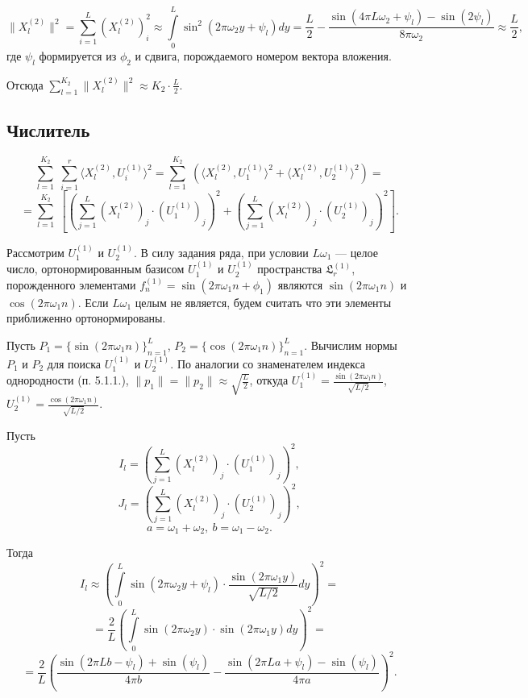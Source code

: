 \documentclass[specialist, substylefile = spbu.rtx,
			   subf, href, 12pt]{disser}
\begin{document}
$$ \|X_l^{(2)}\|^2 = \sum\limits_{i=1}^{L}(X_{l}^{(2)})_i^2 \approx \int\limits_{0}^{L}\sin^2{(2\pi\omega_2 y + \psi_l)}dy = \frac{L}{2} - \frac{\sin(4\pi L\omega_2 + \psi_l) - \sin(2\psi_l)}{8\pi\omega_2} \approx \frac{L}{2}, $$
где $ \psi_l $ формируется из $ \phi_2 $ и сдвига, порождаемого номером вектора вложения.

Отсюда $\sum\limits_{l=1}^{K_2}\|X_l^{(2)}\|^2 \approx K_2\cdot\frac{L}{2}$.


\subsection{Числитель}
$$ \sum\limits_{l=1}^{K_2}\;\sum\limits_{i=1}^{r}\langle X_l^{(2)}, U_i^{(1)}\rangle^2 = 
\sum\limits_{l=1}^{K_2}\;\left ( \langle X_l^{(2)}, U_1^{(1)}\rangle^2 + \langle X_l^{(2)}, U_2^{(1)}\rangle^2 \right ) = $$
$$ =  \sum\limits_{l=1}^{K_2}\; \left [ \left (\sum\limits_{j=1}^{L}(X_{l}^{(2)})_j\cdot (U_{1}^{(1)})_j\right )^2 + \left ( \sum\limits_{j=1}^{L}(X_{l}^{(2)})_j\cdot (U_{2}^{(1)})_j\right )^2 \right ].$$

Рассмотрим $ U_{1}^{(1)} $ и $U_{2}^{(1)} $. В силу задания ряда, при условии $ L\omega_1 $ --- целое число, ортонормированным базисом $ U_{1}^{(1)} $ и $U_{2}^{(1)} $ пространства $ \mathfrak{L}_r^{(1)} $, порожденного элементами $ f_n^{(1)} = \sin(2\pi\omega_1 n + \phi_1) $ являются $ \sin(2\pi\omega_1 n) $ и $ \cos(2\pi\omega_1 n) $. Если $ L\omega_1 $ целым не является, будем считать что эти элементы приближенно ортонормированы.

Пусть $ P_1 = \{\sin(2\pi\omega_1 n)\}_{n=1}^L $, $ P_2 = \{\cos(2\pi\omega_1 n)\}_{n=1}^L $. Вычислим нормы $ P_1 $ и $ P_2 $ для поиска $ U_{1}^{(1)} $ и $U_{2}^{(1)} $. 
По аналогии со знаменателем индекса однородности (п. 5.1.1.), $ \|p_1\| = \|p_2\| \approx \sqrt{\frac{L}{2}} $, откуда $ U_{1}^{(1)} = \frac{\sin(2\pi\omega_1 n)}{\sqrt{L/2}} $, $ U_{2}^{(1)} = \frac{\cos(2\pi\omega_1 n)}{\sqrt{L/2}} $.

Пусть  
$$ I_l =  \left (\sum\limits_{j=1}^{L}(X_{l}^{(2)})_j\cdot (U_{1}^{(1)})_j\right )^2, $$
$$ J_l =  \left (\sum\limits_{j=1}^{L}(X_{l}^{(2)})_j\cdot (U_{2}^{(1)})_j\right )^2, $$
$$ a = \omega_1 + \omega_2,\ b = \omega_1 - \omega_2. $$

Тогда
$$ I_l \approx \left( \int\limits_{0}^{L}\sin(2\pi\omega_2 y + \psi_l) \cdot \frac{\sin(2\pi\omega_1 y)}{\sqrt{L/2}}dy \right)^2 = $$
$$ = \frac{2}{L} \left(\int\limits_{0}^{L}\sin(2\pi\omega_2 y) \cdot \sin(2\pi\omega_1 y)dy\right )^2 = $$
$$ = \frac{2}{L} 
\left(  
\frac{\sin(2\pi Lb - \psi_l) + \sin(\psi_l)}{4\pi b} - \frac{\sin(2\pi La + \psi_l) - \sin(\psi_l)}{4\pi a}
\right)^2. $$
\end{document}
